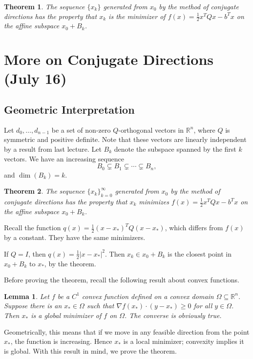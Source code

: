 \documentclass[11pt]{article}
\newcommand{\R}{\mathbb{R}}
\newtheorem{theorem}{Theorem}[subsection]
\newtheorem{lemma}{Lemma}[subsection]
\begin{document}
\begin{theorem}
The sequence $\{x_k\}$ generated from $x_0$ by the method of conjugate directions has the property that $x_k$ is the minimizer of $f(x) = \frac{1}{2}x^TQx - b^Tx$ on the affine subspace $x_0 + B_k$.
\end{theorem}

\newpage

\section{More on Conjugate Directions (July 16)}

\subsection{Geometric Interpretation}

Let $d_0, \dots, d_{n-1}$ be a set of non-zero $Q$-orthogonal vectors in $\R^n$, where $Q$ is symmetric and positive definite. Note that these vectors are linearly independent by a result from last lecture. Let $B_k$ denote the subspace spanned by the first $k$ vectors. We have an increasing sequence
\[
B_0 \subsetneq B_1 \subsetneq \cdots \subsetneq B_n,
\]
and $\dim(B_k) = k$.

\begin{theorem}
The sequence $\{x_k\}_{k=0}^\infty$ generated from $x_0$ by the method of conjugate directions has the property that $x_k$ minimizes $f(x) = \frac{1}{2}x^TQx - b^Tx$ on the affine subspace $x_0 + B_k$.
\end{theorem}

Recall the function $q(x) = \frac{1}{2}(x-x_*)^TQ(x-x_*)$, which differs from $f(x)$ by a constant. They have the same minimizers.

If $Q = I$, then $q(x) = \frac{1}{2}|x-x_*|^2$. Then $x_k \in x_0 + B_k$ is the closest point in $x_0 + B_k$ to $x_*$, by the theorem.

Before proving the theorem, recall the following result about convex functions.

\begin{lemma}
Let $f$ be a $C^1$ convex function defined on a convex domain $\Omega \subseteq \R^n$. Suppose there is an $x_* \in \Omega$ such that $\nabla f(x_*) \cdot (y - x_*) \geq 0$ for all $y \in \Omega$. Then $x_*$ is a global minimizer of $f$ on $\Omega$. The converse is obviously true.
\end{lemma}

Geometrically, this means that if we move in any feasible direction from the point $x_*$, the function is increasing. Hence $x_*$ is a local minimizer; convexity implies it is global. With this result in mind, we prove the theorem.
\end{document}
